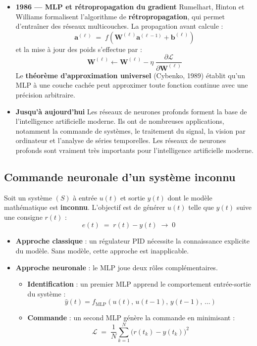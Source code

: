 \begin{itemize}[label=$\bullet$]
	\item \textbf{1986 --- MLP et rétropropagation du gradient}
	Rumelhart, Hinton et Williams formalisent l'algorithme de
	\textbf{rétropropagation}, qui permet d'entraîner des réseaux
	multicouches. La propagation avant calcule :
	\[
	\mathbf{a}^{(\ell)} \;=\; f\!\left(
	\mathbf{W}^{(\ell)}\mathbf{a}^{(\ell-1)}
	+ \mathbf{b}^{(\ell)}\right)
	\]
	et la mise à jour des poids s'effectue par :
	\[
	\mathbf{W}^{(\ell)} \leftarrow \mathbf{W}^{(\ell)}
	- \eta\;\frac{\partial \mathcal{L}}
	{\partial \mathbf{W}^{(\ell)}}
	\]
	Le \textbf{théorème d'approximation universel} (Cybenko,
	1989) établit qu'un MLP à une couche cachée peut approximer
	toute fonction continue avec une précision arbitraire.
	
	\item \textbf{Jusqu'à aujourd'hui}
	Les réseaux de neurones profonds forment la base de l'intelligence artificielle moderne. Ils ont de nombreuses applications, notamment la commande de systèmes, le traitement du signal, la vision par ordinateur et l'analyse de séries temporelles. Les réseaux de neurones profonds sont vraiment très importants pour l'intelligence artificielle moderne.
	
\end{itemize}

\subsection{Commande neuronale d'un système inconnu}

Soit un système $(S)$ à entrée $u(t)$ et sortie $y(t)$ dont le
modèle mathématique est \textbf{inconnu}. L'objectif est de
générer $u(t)$ telle que $y(t)$ suive une consigne $r(t)$ :
\[
e(t) \;=\; r(t) - y(t) \;\longrightarrow\; 0
\]

\begin{itemize}[label=$\bullet$]
	
	\item \textbf{Approche classique} : un régulateur PID nécessite
	la connaissance explicite du modèle. Sans modèle,
	cette approche est inapplicable.
	
	\item \textbf{Approche neuronale} : le MLP joue deux rôles
	complémentaires.
	\begin{itemize}[label=$\circ$]
		\item \textbf{Identification} : un premier MLP apprend
		le comportement entrée-sortie du système :
		\[
		\hat{y}(t) = f_{\text{MLP}}\!\left(
		u(t),\, u(t-1),\, y(t-1),\, \ldots\right)
		\]
		\item \textbf{Commande} : un second MLP génère la
		commande en minimisant :
		\[
		\mathcal{L} \;=\; \frac{1}{N}\sum_{k=1}^{N}
		\bigl(r(t_k) - y(t_k)\bigr)^2
		\]
	\end{itemize}
	
\end{itemize}

